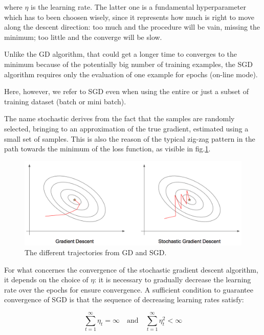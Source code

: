 		where $\eta$ is the learning rate. The latter one is a fundamental hyperparameter which has to been choosen wisely, since it represents how much is right to move along the descent direction: too much and the procedure will be vain, missing the minimum; too little and the converge will be slow.

		Unlike the GD algorithm, that could get a longer time to converges to the minimum because of the potentially big number of training examples, the SGD algorithm requires only the evaluation of one example for epochs (on-line mode).

		Here, however, we refer to SGD even when using the entire or just a subset of training dataset (batch or mini batch).

		The name stochastic derives from the fact that the samples are randomly selected, bringing to an approximation of the true gradient, estimated using a small set of samples. This is also the reason of the typical zig-zag pattern in the path towards the minimum of the loss function, as visible in fig.\ref{fig:gradient}.
		\begin{figure}
			\centering
		    \includegraphics[width=.8\linewidth, scale=0.7]{img/figures/gradient.png}
			\caption{The different trajectories from GD and SGD.}
			\label{fig:gradient}
		\end{figure}
		
		For what concernes the convergence of the stochastic gradient descent algorithm, it depends on the choice of $\eta$: it is necessary to gradually decrease the learning rate over the epochs for ensure convergence.
		A sufficient condition to guarantee convergence of SGD is that the sequence of decreasing learning rates satisfy:

		\begin{equation}
			\label{delta}
			\sum_{t=1}^\infty \eta_t = \infty \text{  } \text{ and }\text{  } \sum_{t=1}^\infty \eta_t^2 < \infty 
		\end{equation}
		
